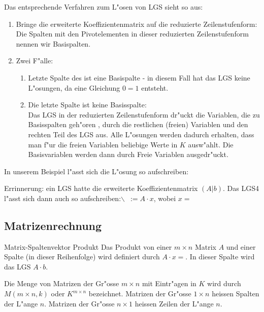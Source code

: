 \documentclass[11pt]{article}
\theoremstyle{remark}
\theoremstyle{definition}
\theoremstyle{remark}
\begin{document}
Das entsprechende Verfahren zum L"osen von LGS sieht so aus:
\begin{relation}
\begin{enumerate}
\item Bringe die erweiterte Koeffizientenmatrix auf die reduzierte
Zeilenstufenform: \\
Die Spalten mit den Pivotelementen in dieser reduzierten Zeilenstufenform
nennen wir Basispalten.
\item Zwei F"alle:
\begin{enumerate}
\item Letzte Spalte des ist eine Basispalte - in diesem Fall hat das LGS keine
L"osungen, da eine Gleichung \(0=1\) entsteht.
\item Die letzte Spalte ist keine Basisspalte: \\
Das LGS in der reduzierten Zeilenstufenform dr"uckt die Variablen, die zu
Basisspalten geh"oren , durch die restlichen (freien) Variablen und den
rechten Teil des LGS aus. Alle L"osungen werden dadurch erhalten, dass
man f"ur die freien Variablen beliebige Werte in \(K\) ausw"ahlt. Die
Basisvariablen werden dann durch Freie Variablen ausgedr"uckt.
\end{enumerate}
\end{enumerate}
\end{relation}

In unserem Beispiel l"asst sich die L"osung so aufschreiben: 


Errinnerung: ein LGS hatte die erweiterte Koeffizientenmatrix \((A|b)\). Das LGS4
l"asst sich dann auch so aufschreiben:$\backslash$\ \(:=A\cdot x\), wobei \(x=\)


\subsection{Matrizenrechnung}
\label{sec:org0f3e63e}
\begin{definition}{Matrix-Spaltenvektor Produkt}{}
Das Produkt von einer \(m\times n\) Matrix \(A\) und einer Spalte (in dieser
Reihenfolge) wird definiert durch \(A\cdot x =\). In dieser Spalte wird das LGS
\(A\cdot b\).
\end{definition}

Die Menge von Matrizen der Gr"osse \(m\times n\) mit Eintr"agen in \(K\) wird durch
\(M(m\times n, k)\) oder \(K^{m\times n}\) bezeichnet. Matrizen der Gr"osse \(1\times
n\) heissen Spalten der L"ange \(n\). Matrizen der Gr"osse \(n\times 1\) heissen
Zeilen der L"ange \(n\).
\end{document}
